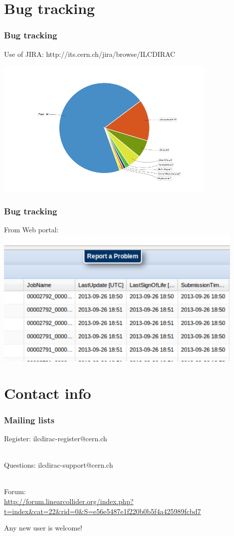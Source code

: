 \documentclass[10pt,table,dvipsnames]{beamer}
\begin{document}
\section{Bug tracking}
\begin{frame}
\frametitle{Bug tracking}
Use of JIRA: http://its.cern.ch/jira/browse/ILCDIRAC
\begin{center}
\includegraphics[width=0.8\textwidth]{charts_1}
\end{center}
\end{frame}
\begin{frame}
\frametitle{Bug tracking}
From Web portal:
\centering
\includegraphics[width=0.9\textwidth]{ReportProb} 
\end{frame}

\section{Contact info}
\begin{frame}
\frametitle{Mailing lists}
Register: ilcdirac-register@cern.ch

~\\

Questions: ilcdirac-support@cern.ch

~\\

Forum:\\ 
\scriptsize \url{http://forum.linearcollider.org/index.php?t=index&cat=22&rid=0&S=e56e5487e1f220b0b5f4a425989fcbd7}
\vfill
\begin{center}
\alert{\Large Any new user is welcome!}
\end{center}

\label{lastframe}
\end{frame} 
 
\end{document}
